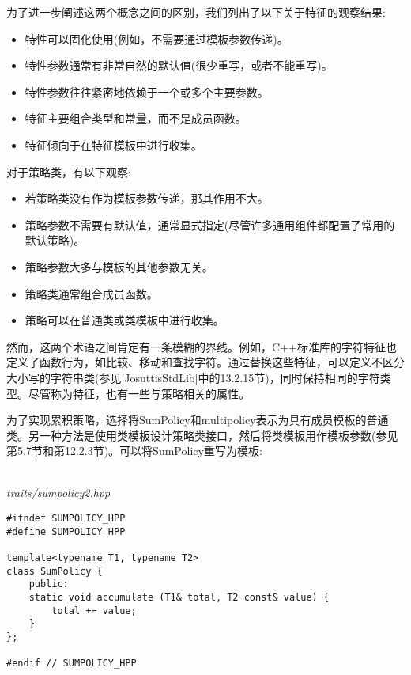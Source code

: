 为了进一步阐述这两个概念之间的区别，我们列出了以下关于特征的观察结果:

\begin{itemize}
\item 
特性可以固化使用(例如，不需要通过模板参数传递)。

\item 
特性参数通常有非常自然的默认值(很少重写，或者不能重写)。

\item 
特性参数往往紧密地依赖于一个或多个主要参数。

\item 
特征主要组合类型和常量，而不是成员函数。

\item 
特征倾向于在特征模板中进行收集。
\end{itemize}

对于策略类，有以下观察:

\begin{itemize}
\item 
若策略类没有作为模板参数传递，那其作用不大。

\item 
策略参数不需要有默认值，通常显式指定(尽管许多通用组件都配置了常用的默认策略)。

\item 
策略参数大多与模板的其他参数无关。

\item 
策略类通常组合成员函数。

\item 
策略可以在普通类或类模板中进行收集。
\end{itemize}

然而，这两个术语之间肯定有一条模糊的界线。例如，C++标准库的字符特征也定义了函数行为，如比较、移动和查找字符。通过替换这些特征，可以定义不区分大小写的字符串类(参见[JosuttisStdLib]中的13.2.15节)，同时保持相同的字符类型。尽管称为特征，也有一些与策略相关的属性。


为了实现累积策略，选择将SumPolicy和multipolicy表示为具有成员模板的普通类。另一种方法是使用类模板设计策略类接口，然后将类模板用作模板参数(参见第5.7节和第12.2.3节)。可以将SumPolicy重写为模板:

\hspace*{\fill} \\ %
\noindent
\textit{traits/sumpolicy2.hpp}
\begin{lstlisting}[style=styleCXX]
#ifndef SUMPOLICY_HPP
#define SUMPOLICY_HPP

template<typename T1, typename T2>
class SumPolicy {
	public:
	static void accumulate (T1& total, T2 const& value) {
		total += value;
	}
};

#endif // SUMPOLICY_HPP
\end{lstlisting}

